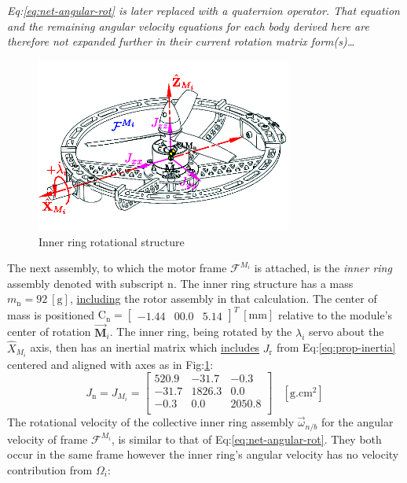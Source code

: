 \emph{\color{gray} Eq:\ref{eq:net-angular-rot} is later replaced with a quaternion operator. That equation and the remaining angular velocity equations for each body derived here are therefore not expanded further in their current rotation matrix form(s)\ldots}
\par
\begin{figure}[htbp]
\vspace{-12pt}
\centering
\includegraphics[width=0.75\textwidth]{figs/inertia-inner}
\vspace{-10pt}
\caption{Inner ring rotational structure}
\label{fig:inertia-inner}
\end{figure}
The next assembly, to which the motor frame $\mathcal{F}^{M_i}$ is attached, is the \emph{inner ring} assembly denoted with subscript n. The inner ring structure has a mass $m_\text{n}=92~[\text{g}]$, \underline{including} the rotor assembly in that calculation. The center of mass is positioned $\text{C}_{\text{n}}=\begin{bmatrix}-1.44&00.0&5.14\end{bmatrix}^T~[\text{mm}]$ relative to the module's center of rotation $\vec{\mathbf{M}}_i$. The inner ring, being rotated by the $\lambda_i$ servo about the $\hat{X}_{M_i}$ axis, then has an inertial matrix which \underline{includes} $J_\text{r}$ from Eq:\ref{eq:prop-inertia} centered and aligned with axes as in Fig:\ref{fig:inertia-inner}:
\begin{equation} \label{eq:inertia.inner}
J_\text{n}=J_{M_i}=\begin{bmatrix}
520.9 & -31.7	& -0.3\\
-31.7 & 1826.3 & 0.0\\
-0.3 & 0.0	& 2050.8\\
\end{bmatrix}~~~~[\text{g.cm}^2]
\end{equation}
The rotational velocity of the collective inner ring assembly $\vec{\omega}_{n/b}$ for the angular velocity of frame $\mathcal{F}^{M_i}$, is similar to that of Eq:\ref{eq:net-angular-rot}. They both occur in the same frame however the inner ring's angular velocity has no velocity contribution from $\Omega_i$:
